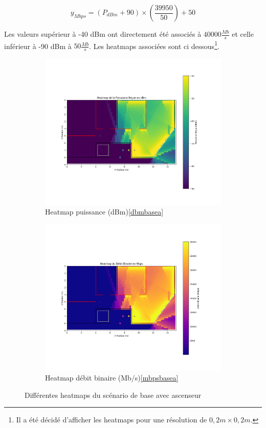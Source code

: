 \begin{equation}
    y_{Mbps}= (P_{dBm}+90)\times (\frac{39950}{50}) +50
\end{equation} 

Les valeurs supérieur à -40 dBm ont directement été associés à $40000 \frac{Mb}{s}$ et celle inférieur à -90 dBm à $50 \frac{Mb}{s}$.
Les heatmaps associées sont ci dessous\footnote{Il a été décidé d'afficher les heatmaps pour une résolution de $0,2m \times 0,2m$.}.

\begin{figure}[H]
\centering
\begin{subfigure}[b]{0.49\textwidth}
    \centering
    \includegraphics[width=\textwidth]{Pictures/dBm.png}
    \caption{Heatmap puissance (dBm)\ref{dbmbasea}}
    \label{fig:direct}
\end{subfigure}
\hfill
\begin{subfigure}[b]{0.49\textwidth}
    \centering
    \includegraphics[width=\textwidth]{Pictures/mbps.png}
    \caption{Heatmap débit binaire (Mb/s)\ref{mbpsbasea}}
    \label{fig:}
\end{subfigure}
\caption{Différentes heatmaps du scénario de base avec ascenseur }
\label{fig:ray_tracing}
\end{figure}

